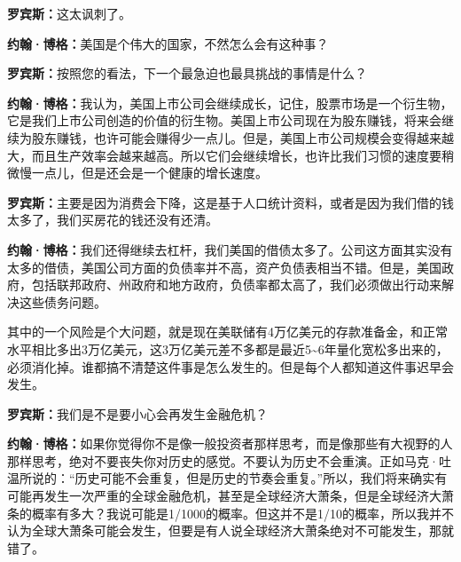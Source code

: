 \begin{BookQuote}
\textbf{罗宾斯：}这太讽刺了。
\end{BookQuote}

\begin{BookQuote}
\textbf{约翰·博格：}美国是个伟大的国家，不然怎么会有这种事？
\end{BookQuote}

\begin{BookQuote}
\textbf{罗宾斯：}按照您的看法，下一个最急迫也最具挑战的事情是什么？
\end{BookQuote}

\begin{BookQuote}
\textbf{约翰·博格：}我认为，美国上市公司会继续成长，记住，股票市场是一个衍生物，它是我们上市公司创造的价值的衍生物。美国上市公司现在为股东赚钱，将来会继续为股东赚钱，也许可能会赚得少一点儿。但是，美国上市公司规模会变得越来越大，而且生产效率会越来越高。所以它们会继续增长，也许比我们习惯的速度要稍微慢一点儿，但是还会是一个健康的增长速度。
\end{BookQuote}

\begin{BookQuote}
\textbf{罗宾斯：}主要是因为消费会下降，这是基于人口统计资料，或者是因为我们借的钱太多了，我们买房花的钱还没有还清。
\end{BookQuote}

\begin{BookQuote}
\textbf{约翰·博格：}我们还得继续去杠杆，我们美国的借债太多了。公司这方面其实没有太多的借债，美国公司方面的负债率并不高，资产负债表相当不错。但是，美国政府，包括联邦政府、州政府和地方政府，负债率都太高了，我们必须做出行动来解决这些债务问题。
\end{BookQuote}

其中的一个风险是个大问题，就是现在美联储有4万亿美元的存款准备金，和正常水平相比多出3万亿美元，这3万亿美元差不多都是最近5\textasciitilde{}6年量化宽松多出来的，必须消化掉。谁都搞不清楚这件事是怎么发生的。但是每个人都知道这件事迟早会发生。

\begin{BookQuote}
\textbf{罗宾斯：}我们是不是要小心会再发生金融危机？
\end{BookQuote}

\begin{BookQuote}
\textbf{约翰·博格：}如果你觉得你不是像一般投资者那样思考，而是像那些有大视野的人那样思考，绝对不要丧失你对历史的感觉。不要认为历史不会重演。正如马克·吐温所说的：“历史可能不会重复，但是历史的节奏会重复。”所以，我们将来确实有可能再发生一次严重的全球金融危机，甚至是全球经济大萧条，但是全球经济大萧条的概率有多大？我说可能是1/1000的概率。但这并不是1/10的概率，所以我并不认为全球大萧条可能会发生，但要是有人说全球经济大萧条绝对不可能发生，那就错了。
\end{BookQuote}

